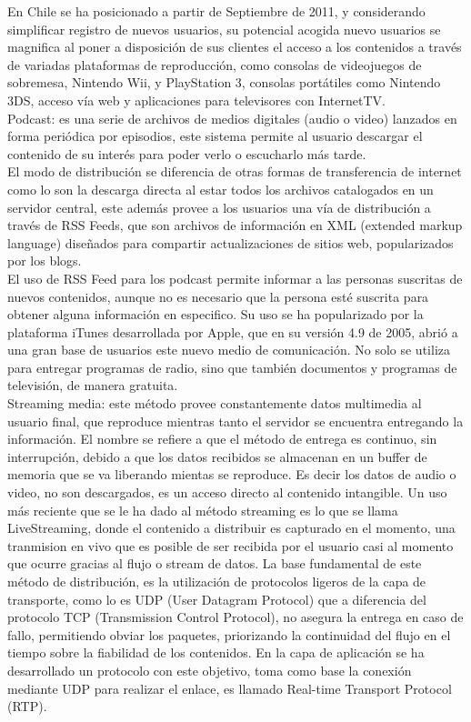 En Chile se ha posicionado a partir de Septiembre de 2011, y considerando simplificar registro de nuevos usuarios, su potencial acogida nuevo usuarios se magnifica al poner a disposición de sus clientes el acceso a los contenidos a través de variadas plataformas de reproducción, como consolas de videojuegos de sobremesa, Nintendo Wii, y PlayStation 3, consolas portátiles como Nintendo 3DS, acceso vía web y aplicaciones para televisores con InternetTV. \\

Podcast: es una serie de archivos de medios digitales (audio o video) lanzados en forma periódica por episodios, este sistema permite al usuario descargar el contenido de su interés para poder verlo o escucharlo más tarde.\\

El modo de distribución se diferencia de otras formas de transferencia de internet como lo son la descarga directa al estar todos los archivos catalogados en un servidor central, este además provee a los usuarios una vía de distribución a través de RSS Feeds, que son archivos de información en XML (extended markup language) diseñados para compartir actualizaciones de sitios web, popularizados por los blogs.\\ 
El uso de RSS Feed para los podcast permite informar a las personas suscritas de nuevos contenidos, aunque no es necesario que la persona esté suscrita para obtener alguna información en especifico. 
Su uso se ha popularizado por la plataforma iTunes desarrollada por Apple, que en su versión 4.9 de 2005, abrió a una gran base de usuarios este nuevo medio de comunicación. No solo se utiliza para entregar programas de radio, sino que también documentos y programas de televisión, de manera gratuita.\\

Streaming media: este método provee constantemente datos multimedia al usuario final, que reproduce mientras tanto el servidor se encuentra entregando la información.
El nombre se refiere a que el método de entrega es continuo, sin interrupción, debido a que los datos recibidos se almacenan en un buffer de memoria que se va liberando mientas se reproduce. Es decir los datos de audio o video, no son descargados,  es un acceso directo al contenido intangible.
Un uso más reciente que se le ha dado al método streaming es lo que se llama LiveStreaming, donde el contenido a distribuir es capturado en el momento, una tranmision en vivo que es posible de ser recibida por el usuario casi al momento que ocurre gracias al flujo o stream de datos.
La base fundamental de este método de distribución, es la utilización de protocolos ligeros de la capa de transporte, como lo es UDP (User Datagram Protocol) que a diferencia del protocolo TCP (Transmission Control Protocol), no asegura la entrega en caso de fallo, permitiendo obviar los paquetes, priorizando la continuidad del flujo en el tiempo sobre la fiabilidad de los contenidos.  En la capa de aplicación se ha desarrollado un protocolo con este objetivo, toma como base la conexión mediante UDP para realizar el enlace, es llamado Real-time Transport Protocol (RTP).\\

